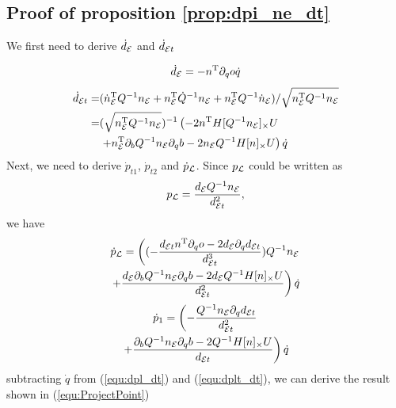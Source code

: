 \documentclass[10pt,twocolumn,twoside]{IEEEtran}
\begin{document}
  \subsection{Proof of proposition \ref{prop:dpi_ne_dt}}\label{proof:dpi_ne_dt}
    We first need to derive $\dot{d}_{\mathcal{E}}$ and $\dot{d}_{\mathcal{E} t}$

    \begin{equation}
      \dot d_{\mathcal{E}} = -n^\mathrm{T} \partial_q o \dot q
    \end{equation}
    \begin{equation}\label{equ:dot det}
      \begin{split}
        \dot d_{\mathcal{E} t} =&  (\dot n_{\mathcal{E}}^\mathrm{T} Q^{-1} n_{\mathcal{E}} + n_{\mathcal{E}}^\mathrm{T} \dot Q^{-1} n_{\mathcal{E}} + n_{\mathcal{E}}^\mathrm{T} Q^{-1} \dot n_{\mathcal{E}}) /\sqrt{n_{\mathcal{E}}^\mathrm{T} Q^{-1} n_{\mathcal{E}}}\\
        = & (\sqrt{n_{\mathcal{E}}^\mathrm{T} Q^{-1} n_{\mathcal{E}}})^{-1}\left(-2n^\mathrm{T} H[Q^{-1}n_{\mathcal{E}}]_\times U \right.\\
        &\left. + n_{\mathcal{E}} ^\mathrm{T} \partial_b Q^{-1} n_{\mathcal{E}} \partial_q b  -2 n_{\mathcal{E}} Q^{-1}H[n]_\times U \right) \dot q
      \end{split}
    \end{equation}
    Next, we need to derive  $\dot p_{t1}$, $\dot p_{t2} $ and $\dot p_{\mathcal{L}}$. Since $p_{\mathcal{L}}$ could be written as
    \begin{equation}
      p_{\mathcal{L}} = \frac{d_{\mathcal{E}} Q^{-1} n_{\mathcal{E}}}{ d_{\mathcal{E} t} ^2},
    \end{equation}
    we have
    \begin{multline}\label{equ:dpl_dt}
        \dot p_{\mathcal{L}} =  \left( (-\frac{d_{\mathcal{E} t} n^\mathrm{T} \partial_q o -2d_{\mathcal{E}} \partial_q d_{\mathcal{E} t}}{d_{\mathcal{E} t}^3} )Q^{-1}n_{\mathcal{E}} \right.\\
        \left .+ \frac{d_{\mathcal{E}}\partial_b Q^{-1} n_{\mathcal{E}} \partial_q b -  2d_{\mathcal{E}} Q^{-1}H[n]_\times U}{d_{\mathcal{E} t}^2}\right) \dot q
    \end{multline}
    \begin{multline}\label{equ:dplt_dt}
        \dot p_{1} =  \left(-\frac{Q^{-1}n_{\mathcal{E}} \partial_q d_{\mathcal{E} t} }{d_{\mathcal{E} t}^2} \right.\\
         \left. + \frac{\partial_b Q^{-1}n_{\mathcal{E}} \partial_q b -  2Q^{-1}H[n]_\times U }{d_{\mathcal{E} t}} \right) \dot q
    \end{multline}
    subtracting $\dot q$ from (\ref{equ:dpl_dt}) and (\ref{equ:dplt_dt}), we can derive the result shown in (\ref{equ:ProjectPoint})


{\small


}
\end{document}
